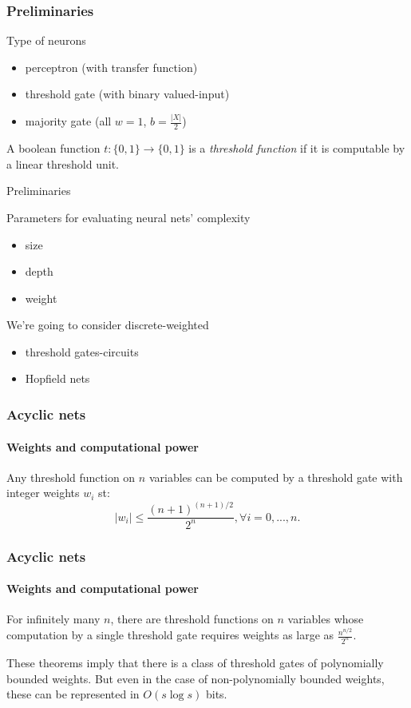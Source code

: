 \documentclass{beamer}
\begin{document}
\begin{frame}
\frametitle{Preliminaries}
Type of neurons
\begin{itemize}
	\item perceptron (with transfer function)
	\item threshold gate (with binary valued-input)
	\item majority gate (all $w=1$, $b=\frac{|X|}{2}$)
\end{itemize}
\begin{definition}
	\justify
	A boolean function $t: \{0,1\} \to \{0,1\} $ is a \textit{threshold function} if it is computable by a linear threshold unit.
\end{definition}
\end{frame}

\begin{frame}{Preliminaries}

Parameters for evaluating neural nets' complexity
\begin{itemize}
	\item size
	\item depth
	\item weight
\end{itemize}
We're going to consider discrete-weighted
\begin{itemize}
\item threshold gates-circuits
\item Hopfield nets
\end{itemize}
\end{frame}

\begin{frame}
\frametitle{Acyclic nets}
\framesubtitle{Weights and computational power}	
	\begin{theorem}
		\justify
		Any threshold function on $n$ variables can be computed by a threshold gate with integer weights $w_i$ st: $$|w_i| \leq \frac{(n+1)^{(n+1)/2}}{2^n}, \forall i =0,...,n.$$
	\end{theorem}
\end{frame}

\begin{frame}
\justify
\frametitle{Acyclic nets}
\framesubtitle{Weights and computational power}	
\begin{theorem}
	\justify
For infinitely many $n$, there are threshold functions on $n$ variables whose computation by a single threshold gate requires weights as large as $\frac{n^{n/2}}{2^n}.$
\end{theorem}
These theorems imply that there is a class of threshold gates of polynomially bounded weights. But even in the case of non-polynomially bounded weights, these can be represented in $O(s \log{s})$ bits.
\end{frame}
\end{document}
